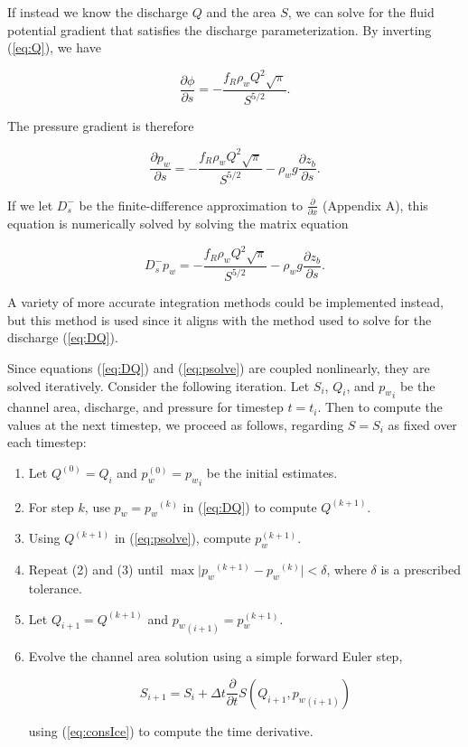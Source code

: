 \documentclass[11pt]{article}
\begin{document}
If instead we know the discharge $Q$ and the area $S$, we can solve for the fluid potential gradient that satisfies the discharge parameterization. By inverting (\ref{eq:Q}), we have
\begin{linenomath*}
\begin{equation}
\label{eq:phisolve}
\frac{\partial \phi}{\partial s} = -\frac{f_R \rho_w Q^2\sqrt{\pi}}{S^{5/2}}.
\end{equation}
\end{linenomath*}
The pressure gradient is therefore
\begin{linenomath*}
\begin{equation*}
\frac{\partial p_w}{\partial s} = -\frac{f_R \rho_w Q^2\sqrt{\pi}}{S^{5/2}} - \rho_w g \frac{\partial z_b}{\partial s}.
\end{equation*}
\end{linenomath*}
If we let $D_s^-$ be the finite-difference approximation to $\frac{\partial}{\partial x}$ (Appendix A), this equation is numerically solved by solving the matrix equation
\begin{linenomath*}
\begin{equation}
\label{eq:psolve}
D_s^- p_w =  -\frac{f_R \rho_w Q^2\sqrt{\pi}}{S^{5/2}} - \rho_w g \frac{\partial z_b}{\partial s}.
\end{equation}
\end{linenomath*}
A variety of more accurate integration methods could be implemented instead, but this method is used since it aligns with the method used to solve for the discharge (\ref{eq:DQ}).

Since equations (\ref{eq:DQ}) and (\ref{eq:psolve}) are coupled nonlinearly, they are solved iteratively. Consider the following iteration. Let $S_i$, $Q_i$, and ${p_w}_i$ be the channel area, discharge, and pressure for timestep $t=t_i$. Then to compute the values at the next timestep, we proceed as follows, regarding $S = S_i$ as fixed over each timestep:
\begin{enumerate}
\item Let $Q^{(0)} = Q_i$ and $p_w^{(0)} = {p_w}_i$ be the initial estimates.
\item For step $k$, use $p_w = {p_w}^{(k)}$ in (\ref{eq:DQ}) to compute $Q^{(k+1)}$.
\item Using $Q^{(k+1)}$ in (\ref{eq:psolve}), compute $p_w^{(k+1)}$.
\item Repeat (2) and (3) until $\max\lvert{p_w}^{(k+1)} - {p_w}^{(k)}\rvert < \delta$, where $\delta$ is a prescribed tolerance.
\item Let $Q_{i+1} = Q^{(k+1)}$ and ${p_w}_{(i+1)} = p_w^{(k+1)}$.
\item{Evolve the channel area solution using a simple forward Euler step,
\begin{linenomath*}
\begin{equation*}
S_{i+1} = S_i + \Delta t \frac{\partial}{\partial t}S(Q_{i+1}, {p_w}_{(i+1)})
\end{equation*}
\end{linenomath*}
using (\ref{eq:consIce}) to compute the time derivative.
}
\end{enumerate}
\end{document}
